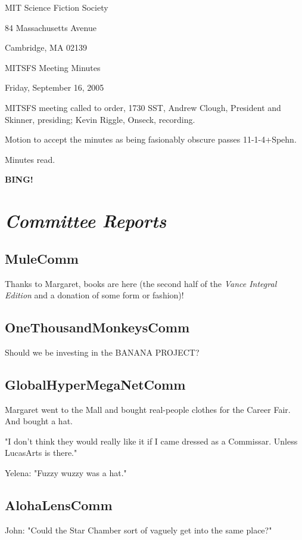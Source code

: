 \documentclass[10pt]{article}
\newcommand{\bing}{{\bf BING!} }
\newcommand{\goto}[1]{\bing \vskip 12pt \section*{{\em{#1}}}}
\begin{document}
\begin{center}

MIT Science Fiction Society

84 Massachusetts Avenue

Cambridge, MA 02139

\vspace{12pt}

MITSFS Meeting Minutes

Friday, September 16, 2005

\end{center}

\vspace{18pt}

\setlength{\parskip}{6pt}

\noindent
MITSFS meeting called to order, 1730 SST, Andrew Clough, President and 
Skinner, presiding; Kevin Riggle, Onseck, recording.

Motion to accept the minutes as being fasionably obscure passes 11-1-4+Spehn.

Minutes read.

\goto{Committee Reports}
\subsection*{MuleComm}
Thanks to Margaret, books are here (the second half of the \emph{Vance Integral Edition} and a 
donation of some form or fashion)!

\subsection*{OneThousandMonkeysComm}
Should we be investing in the BANANA PROJECT?

\subsection*{GlobalHyperMegaNetComm}
Margaret went to the Mall and bought real-people clothes for the Career Fair.  And bought a hat.

"I don't think they would really like it if I came dressed as a Commissar.  Unless LucasArts 
is there."

Yelena: "Fuzzy wuzzy was a hat."

\subsection*{AlohaLensComm}
John: "Could the Star Chamber sort of vaguely get into the same place?"
\end{document}
